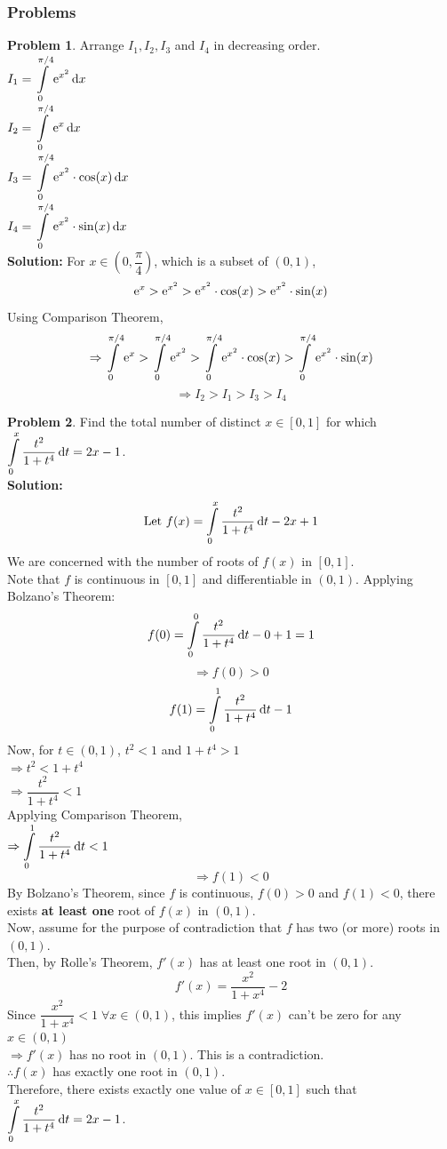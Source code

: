 \documentclass[14]{article}
\theoremstyle{definition}
\newtheorem{prob}{Problem}
\theoremstyle{case}
\begin{document}
\subsubsection{Problems}
\begin{prob}
Arrange $I_1, I_2, I_3$ and $I_4$ in decreasing order.\\
$I_1 = \displaystyle\int\limits_0^{\pi/4}{\rm e}^{x^2} \dif x$\\
$I_2 = \displaystyle\int\limits_0^{\pi/4}{\rm e}^{x} \dif x$\\
$I_3 = \displaystyle\int\limits_0^{\pi/4}{\rm e}^{x^2} \cdot \cos(x) \dif x$\\
$I_4 = \displaystyle\int\limits_0^{\pi/4}{\rm e}^{x^2} \cdot \sin(x) \dif x$\\
\textbf{Solution: } For $x \in \left(0, \dfrac{\pi}{4} \right)$, which is a subset of $(0, 1)$,
\[{\rm e}^x > {\rm e}^{x^2} > {\rm e}^{x^2} \cdot \cos(x) > {\rm e}^{x^2} \cdot \sin(x)\]
Using Comparison Theorem,
\[\Rightarrow \int\limits_0^{\pi/4} {\rm e}^x > \int\limits_0^{\pi/4} {\rm e}^{x^2} > \int\limits_0^{\pi/4} {\rm e}^{x^2} \cdot \cos(x) > \int\limits_0^{\pi/4} {\rm e}^{x^2} \cdot \sin(x)\]
\[\Rightarrow I_2 > I_1 > I_3 > I_4\]
\end{prob}
\pagebreak
\begin{prob}
Find the total number of distinct $x \in [0, 1]$ for which $\displaystyle\int\limits_0^x \dfrac{t^2}{1+t^4} \dif t = 2x-1$.\\
\textbf{Solution:}\\
\[\text{Let } f(x) = \int\limits_0^x \dfrac{t^2}{1+t^4} \dif t - 2x + 1\]
We are concerned with the number of roots of $f(x)$ in $[0, 1]$.\\
Note that $f$ is continuous in $[0, 1]$ and differentiable in $(0, 1)$. Applying Bolzano's Theorem:
\[f(0) = \int\limits_0^0 \dfrac{t^2}{1+t^4} \dif t - 0 + 1 = 1\]
\[\Rightarrow f(0) > 0\]
\[f(1) = \int\limits_0^1 \dfrac{t^2}{1+t^4} \dif t - 1\]
Now, for $t \in (0, 1)$, $t^2 < 1$ and $1 + t^4 > 1$\\
$\Rightarrow t^2 < 1 + t^4$\\
$\Rightarrow \dfrac{t^2}{1+t^4} < 1$\\
Applying Comparison Theorem,\\
$\Rightarrow \displaystyle\int\limits_0^1 \dfrac{t^2}{1+t^4} \dif t < 1$ 
\[\Rightarrow f(1) < 0\]
By Bolzano's Theorem, since $f$ is continuous, $f(0) > 0$ and $f(1) < 0$, there exists \textbf{at least one} root of $f(x)$ in $(0, 1)$.\\
Now, assume for the purpose of contradiction that $f$ has two (or more) roots in $(0, 1)$.\\
Then, by Rolle's Theorem, $f'(x)$ has at least one root in $(0, 1)$.
\[f'(x) = \dfrac{x^2}{1+x^4} -2\]
Since $\dfrac{x^2}{1+x^4} < 1 \; \forall x \in (0, 1)$, this implies $f'(x)$ can't be zero for any $x \in (0, 1)$\\
$\Rightarrow f'(x)$ has no root in $(0, 1)$. This is a contradiction.\\
$\therefore f(x)$ has exactly one root in $(0, 1)$.\\
Therefore, there exists exactly one value of $x \in [0, 1]$ such that $\displaystyle\int\limits_0^x \dfrac{t^2}{1+t^4} \dif t = 2x-1$.
\end{prob}
\end{document}
